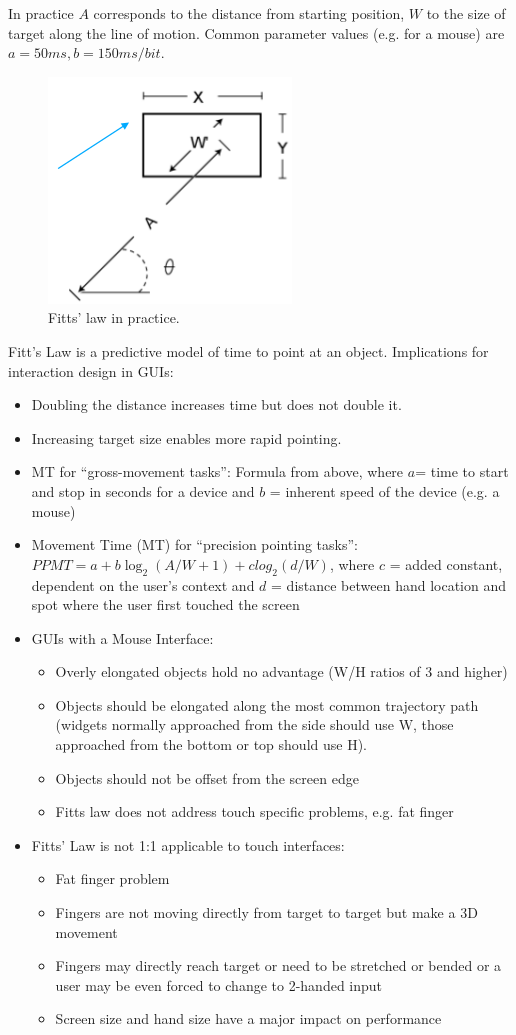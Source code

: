 In practice $A$ corresponds to the distance from starting position, $W$ to the size of target along the line of motion. Common parameter values (e.g. for a mouse) are $a=50ms, b=150ms/bit$.
\begin{figure}[h!]
	\centering
	\includegraphics[width=.3\textwidth]{img/ch05_fitt1.png}
	\caption{Fitts' law in practice.}
	\label{fitt1}
\end{figure}
Fitt's Law is a predictive model of time to point at an object. Implications for interaction design in GUIs:
\begin{itemize}
\item Doubling the distance increases time but does not double it.
\item Increasing target size enables more rapid pointing.
\item MT for ``gross-movement tasks'': Formula from above, where $a$= time to start and stop in seconds for a device and $b$ = inherent speed of the device (e.g. a mouse)
\item Movement Time (MT) for ``precision pointing tasks'': $PPMT = a + b \log_2 (A/W + 1) + c log_2 (d/W)$, where $c$ = added constant, dependent on the user's context and $d$ = distance between hand location and spot where the user first touched the screen
\item GUIs with a Mouse Interface: 
\begin{itemize}
\item Overly elongated objects hold no advantage (W/H ratios of 3 and higher)
\item Objects should be elongated along the most common trajectory path (widgets normally approached from the side should use W, those approached from the bottom or top should use H).
\item Objects should not be offset from the screen edge
\item Fitts law does not address touch specific problems, e.g. fat finger
\end{itemize}
\item Fitts' Law is not 1:1 applicable to touch interfaces:
\begin{itemize}
\item Fat finger problem
\item Fingers are not moving directly from target to target but make a 3D movement
\item Fingers may directly reach target or need to be stretched or bended or a user may be even forced to change to 2-handed input
\item Screen size and hand size have a major impact on performance
\end{itemize}
\end{itemize} 
